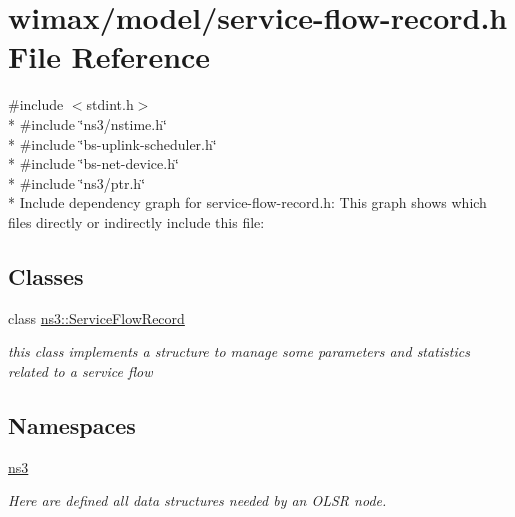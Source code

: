 \hypertarget{service-flow-record_8h}{}\section{wimax/model/service-\/flow-\/record.h File Reference}
\label{service-flow-record_8h}
{\ttfamily \#include $<$stdint.\+h$>$}\\*
{\ttfamily \#include \char`\"{}ns3/nstime.\+h\char`\"{}}\\*
{\ttfamily \#include \char`\"{}bs-\/uplink-\/scheduler.\+h\char`\"{}}\\*
{\ttfamily \#include \char`\"{}bs-\/net-\/device.\+h\char`\"{}}\\*
{\ttfamily \#include \char`\"{}ns3/ptr.\+h\char`\"{}}\\*
Include dependency graph for service-\/flow-\/record.h\+:
This graph shows which files directly or indirectly include this file\+:
\subsection*{Classes}
\begin{DoxyCompactItemize}
\item 
class \hyperlink{classns3_1_1ServiceFlowRecord}{ns3\+::\+Service\+Flow\+Record}
\begin{DoxyCompactList}\small\item\em this class implements a structure to manage some parameters and statistics related to a service flow \end{DoxyCompactList}\end{DoxyCompactItemize}
\subsection*{Namespaces}
\begin{DoxyCompactItemize}
\item 
 \hyperlink{namespacens3}{ns3}
\begin{DoxyCompactList}\small\item\em Here are defined all data structures needed by an O\+L\+SR node. \end{DoxyCompactList}\end{DoxyCompactItemize}
